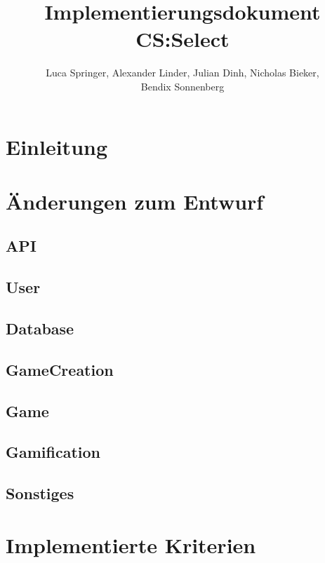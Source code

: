 \documentclass[a4paper]{scrreprt}
\begin{document}
\title{Implementierungsdokument CS:Select}
\author{Luca Springer, Alexander Linder, Julian Dinh, Nicholas Bieker,\\ Bendix Sonnenberg}
\maketitle

\tableofcontents


\chapter{Einleitung}

\chapter{Änderungen zum Entwurf}

\section{API}

\section{User}

\section{Database}

\section{GameCreation}

\section{Game}

\section{Gamification}

\section{Sonstiges}


\chapter{Implementierte Kriterien}
\end{document}
